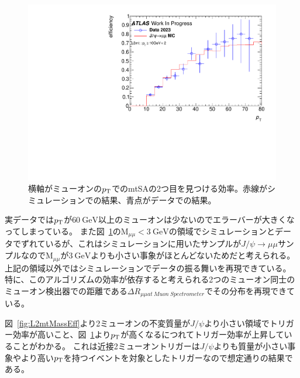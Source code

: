 \begin{figure}[h]
    \centering
    \includegraphics[clip, width=12cm]{fig/4/L2mt_eff_pt_Jpsi.pdf}
    \caption{横軸がミューオンの$p_\mathrm{T}$でのmtSAの2つ目を見つける効率。赤線がシミュレーションでの結果、青点がデータでの結果。}
    \label{fig:L2mtPtEff}
\end{figure}

実データでは$p_\mathrm{T}$が$\SI{60}{\GeV}$以上のミューオンは少ないのでエラーバーが大きくなってしまっている。
また図~\ref{fig:L2mtPtEff}の$\mathrm{M}_{\mu\mu}<\SI{3}{\GeV}$の領域でシミュレーションとデータでずれているが、これはシミュレーションに用いたサンプルが$J/\psi\rightarrow\mu\mu$サンプルなので$\mathrm{M}_{\mu\mu}$が$\SI{3}{\GeV}$よりも小さい事象がほとんどないためだと考えられる。
上記の領域以外ではシミュレーションでデータの振る舞いを再現できている。
特に、このアルゴリズムの効率が依存すると考えられる2つのミューオン同士のミューオン検出器での距離である$\Delta R_{\mu\mu at~Muon~Spectrometer}$でその分布を再現できている。

図~\ref{fig:L2mtMassEff}より2ミューオンの不変質量が$J/\psi$より小さい領域でトリガー効率が高いこと、図~\ref{fig:L2mtPtEff}より$p_\mathrm{T}$が高くなるにつれてトリガー効率が上昇していることがわかる。
これは近接2ミューオントリガーは$J/\psi$よりも質量が小さい事象やより高い$p_\mathrm{T}$を持つイベントを対象としたトリガーなので想定通りの結果である。